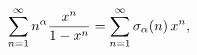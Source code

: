 \[\sum_{n=1}^{\infty}n^{\alpha}\frac{x^{n}}{1-x^{n}}=\sum_{n=1}^{\infty}\mathop{%
\sigma_{\alpha}\/}\nolimits\!\left(n\right)x^{n},\]